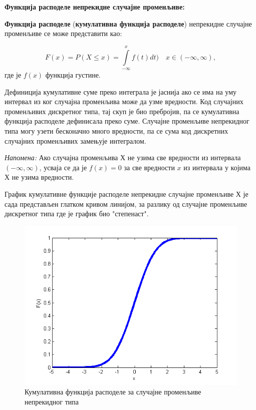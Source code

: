\textbf{Функција расподеле непрекидне случајне променљиве:}


\begin{de}
\textbf{Функција расподеле} (\textbf{кумулативна функција расподеле}) непрекидне случајне променљиве се може представити као:

$$
F(x) = P (X \leq x) = \int \limits_{-\infty}^{x} f(t)dt) \quad x \in (-\infty,\infty),
$$
где је $f(x)$ функција густине.
\end{de}

Дефиниција кумулативне суме преко интеграла је јаснија ако се има на уму интервал из ког случајна променљива може да узме вредности. Код случајних променљивих дискретног типа, тај скуп је био пребројив, па се кумулативна функција расподеле дефинисала преко суме. Случајне променљиве непрекидног типа могу узети бесконачно много вредности, па се сума код дискретних случајних променљивих замењује интегралом.

\textit{Напомена:} Ако случајна променљива Х не узима све вредности из интервала $ (-\infty,\infty)$, усваја се да је $f(x) = 0$ за све вредности $x$ из интервала у којима $Х$ не узима вредности.

График кумулативне функције расподеле непрекидне случајне променљиве $Х$ је сада представљен глатком кривом линијом, за разлику од случајне променљиве дискретног типа где је график био "степенаст".


\begin{figure}[H]
    \centering
\captionsetup{justification=centering}
   \includegraphics[scale=0.5]{./Slike/cdf.png} 
	\caption{Кумулативна функција расподеле за случајне променљиве непрекидног типа} 
	\label{fig:slika13}
\end{figure}



